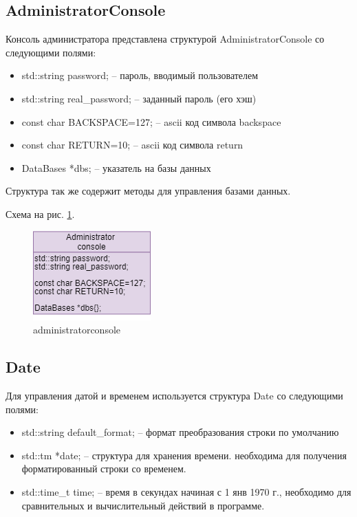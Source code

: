 \subsection{AdministratorConsole}

Консоль администратора представлена структурой AdministratorConsole со следующими полями: 

\begin{itemize}
    \item std::string password; -- пароль, вводимый пользователем
    \item std::string real\_password; -- заданный пароль (его хэш)
    \item const char BACKSPACE=127; -- ascii код символа backspace
    \item const char RETURN=10; -- ascii код символа return
    \item DataBases *dbs{}; -- указатель на базы данных
\end{itemize}

Структура так же содержит методы для управления базами данных.

Схема на рис. \ref{administrator_console}.

\begin{figure}[hpt!]
    \centering
    \includegraphics[width=0.4\linewidth]{photo/administrator_console}
    \caption{administratorconsole}
    \label{administrator_console}
\end{figure}

\subsection{Date}

Для управления датой и временем используется структура Date со следующими полями: 

\begin{itemize}
    \item std::string default\_format{}; -- формат преобразования строки по умолчанию
    \item std::tm *date{}; -- структура для хранения времени. необходима для получения форматированный строки со временем.
    \item std::time\_t time{}; -- время в секундах начиная с 1 янв 1970 г., необходимо для сравнительных и вычислительный действий в программе.
\end{itemize}

